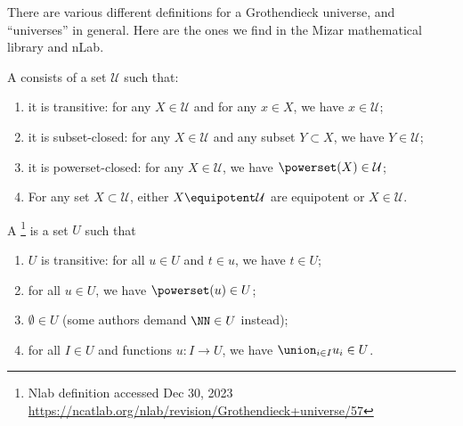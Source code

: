 \begin{node}\label{tg-0001}%
There are various different definitions for a Grothendieck universe, and
``universes'' in general. Here are the ones we find in the Mizar
mathematical library and nLab.

\begin{definition}\label{set:tg-000E}%
A  consists of a set $\mathcal{U}$ such that:
\begin{enumerate}
\item it is transitive: for any $X\in\mathcal{U}$ and for any $x\in X$,
  we have $x\in\mathcal{U}$;
\item it is subset-closed: for any $X\in\mathcal{U}$ and any subset
  $Y\subset X$, we have $Y\in\mathcal{U}$;
\item it is powerset-closed: for any $X\in\mathcal{U}$, we have $\powerset(X)\in\mathcal{U}$;
\item For any set $X\subset\mathcal{U}$, either
  $X\equipotent\mathcal{U}$ are equipotent or $X\in\mathcal{U}$.
\end{enumerate}
\end{definition}

\begin{definition}\label{set:tg-0000}%
A \footnote{Nlab definition accessed
Dec 30, 2023 \url{https://ncatlab.org/nlab/revision/Grothendieck+universe/57}} is a set $U$ such that
\begin{enumerate}
\item $U$ is transitive: for all $u\in U$ and $t\in u$, we have $t\in U$;
\item for all $u\in U$, we have $\powerset(u)\in U$;
\item $\emptyset\in U$ (some authors demand $\NN\in U$ instead);
\item for all $I\in U$ and functions $u\colon I\to U$, we have
  $\union_{i\in I}u_{i}\in U$.
\end{enumerate}
\end{definition}


\end{node}
